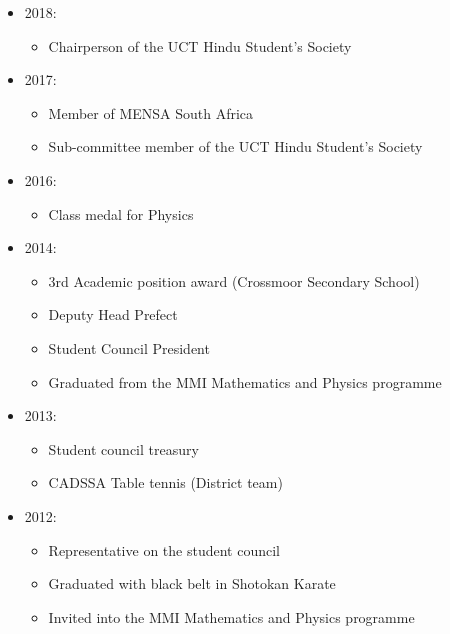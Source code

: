 \documentclass[10pt,a4paper]{altacv}
\begin{document}
\begin{itemize}
    \item 2018:
    \begin{itemize}
        \item Chairperson of the UCT Hindu Student’s Society
    \end{itemize}
    \item 2017:
    \begin{itemize}
        \item Member of MENSA South Africa
        \item Sub-committee member of the UCT Hindu Student’s Society
    \end{itemize}
    \item 2016:
    \begin{itemize}
        \item Class medal for Physics
    \end{itemize}
    \item 2014:
    \begin{itemize}
        \item 3rd Academic position award (Crossmoor Secondary School)
        \item Deputy Head Prefect
        \item Student Council President
        \item Graduated from the MMI Mathematics and Physics programme
    \end{itemize}
    \item 2013:
    \begin{itemize}
        \item Student council treasury
        \item CADSSA Table tennis (District team)
    \end{itemize}
    \item 2012:
    \begin{itemize}
        \item Representative on the student council
        \item Graduated with black belt in Shotokan Karate
        \item Invited into the MMI Mathematics and Physics programme
    \end{itemize}
\end{itemize}
\quad










\end{document}
